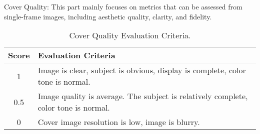 \documentclass{article} \usepackage{iclr2024_conference,times}
\begin{document}
{\begin{table}[h]
\begin{tabular}{cp{11cm}}
\bottomrule
\end{tabular}
\end{table}



\newpage
Cover Quality: This part mainly focuses on metrics that can be assessed from single-frame images, including aesthetic quality, clarity, and fidelity.

\begin{table}[h]
\centering
\caption{Cover Quality Evaluation Criteria.}
\label{sample-table}
\small

\begin{tabular}{cp{11cm}}
\toprule

\textbf{Score} & \textbf{Evaluation Criteria} \\
\midrule
1 & Image is clear, subject is obvious, display is complete, color tone is normal. \\
\midrule
0.5 & Image quality is average. The subject is relatively complete, color tone is normal. \\
\midrule
0 & Cover image resolution is low, image is blurry. \\

\bottomrule
\end{tabular}
\end{table}
 }
\end{document}

